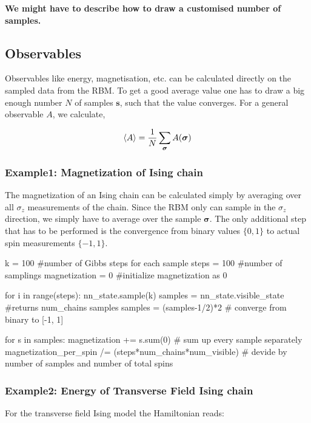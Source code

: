 \documentclass[submission, Phys]{SciPost}
\begin{document}
\textbf{We might have to describe how to draw a customised number of samples.}


\subsection{Observables}
\label{Sec:Observables}

Observables like energy, magnetisation, etc. can be calculated directly on the sampled data from the RBM. To get a good average value one has to draw a big enough number $N$ of samples $\bm{s}$, such that the value converges. For a general observable $A$, we calculate,

\begin{equation}
\braket{A} = \frac{1}{N} \sum_{\bm{\sigma}} A(\bm{\sigma})
\end{equation}

\subsubsection{Example1: Magnetization of Ising chain}

The magnetization of an Ising chain can be calculated simply by averaging over all $\sigma_z$ measurements of the chain. Since the RBM only can sample in the $\sigma_z$ direction, we simply have to average over the sample $\bm{\sigma}$. The only additional step that has to be performed is the convergence from binary values $\{0,1  \}$ to actual spin measurements $\{-1 ,1  \}$.

\begin{python}
k = 100 #number of Gibbs steps for each sample
steps = 100 #number of samplings
magnetization = 0 #initialize magnetization as 0

for i in range(steps):
	nn_state.sample(k)
	samples = nn_state.visible_state #returns num_chains samples
	samples = (samples-1/2)*2 # converge from binary to [-1, 1]

	for s in samples: 
		magnetization += s.sum(0) # sum up every sample separately
magnetization_per_spin /= (steps*num_chains*num_visible) # devide by number of samples and number of total spins
\end{python}

\subsubsection{Example2: Energy of Transverse Field Ising chain}

For the transverse field Ising model the Hamiltonian reads:
\end{document}
